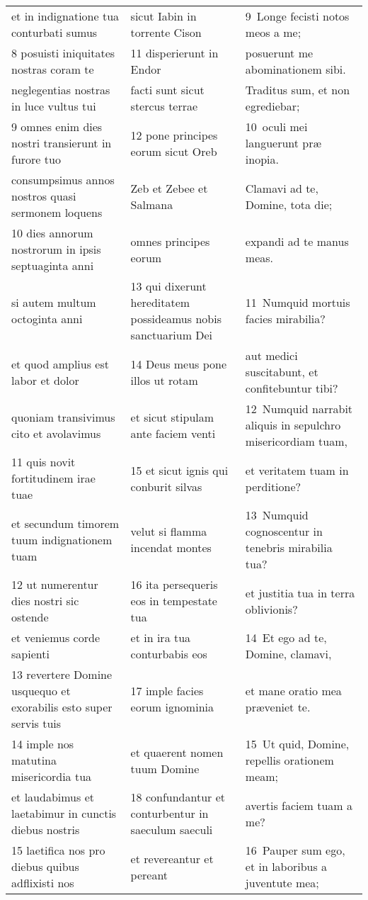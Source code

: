 \documentclass{article}
\begin{document}
\begin{longtable}{@{}p{}p{}p{}@{}}
et in indignatione tua conturbati sumus	&	sicut Iabin in torrente Cison	&	9 Longe fecisti notos meos a me;	\\
8 posuisti iniquitates nostras coram te	&	11 disperierunt in Endor	&	posuerunt me abominationem sibi.	\\
neglegentias nostras in luce vultus tui	&	facti sunt sicut stercus terrae	&	Traditus sum, et non egrediebar;	\\
9 omnes enim dies nostri transierunt in furore tuo	&	12 pone principes eorum sicut Oreb	&	10 oculi mei languerunt præ inopia.	\\
consumpsimus annos nostros quasi sermonem loquens	&	Zeb et Zebee et Salmana	&	Clamavi ad te, Domine, tota die;	\\
10 dies annorum nostrorum in ipsis septuaginta anni	&	omnes principes eorum	&	expandi ad te manus meas.	\\
si autem multum octoginta anni	&	13 qui dixerunt hereditatem possideamus nobis sanctuarium Dei	&	11 Numquid mortuis facies mirabilia?	\\
et quod amplius est labor et dolor	&	14 Deus meus pone illos ut rotam	&	aut medici suscitabunt, et confitebuntur tibi?	\\
quoniam transivimus cito et avolavimus	&	et sicut stipulam ante faciem venti	&	12 Numquid narrabit aliquis in sepulchro misericordiam tuam,	\\
11 quis novit fortitudinem irae tuae	&	15 et sicut ignis qui conburit silvas	&	et veritatem tuam in perditione?	\\
et secundum timorem tuum indignationem tuam	&	velut si flamma incendat montes	&	13 Numquid cognoscentur in tenebris mirabilia tua?	\\
12 ut numerentur dies nostri sic ostende	&	16 ita persequeris eos in tempestate tua	&	et justitia tua in terra oblivionis?	\\
et veniemus corde sapienti	&	et in ira tua conturbabis eos	&	14 Et ego ad te, Domine, clamavi,	\\
13 revertere Domine usquequo et exorabilis esto super servis tuis	&	17 imple facies eorum ignominia	&	et mane oratio mea præveniet te.	\\
14 imple nos matutina misericordia tua	&	et quaerent nomen tuum Domine	&	15 Ut quid, Domine, repellis orationem meam;	\\
et laudabimus et laetabimur in cunctis diebus nostris	&	18 confundantur et conturbentur in saeculum saeculi	&	avertis faciem tuam a me?	\\
15 laetifica nos pro diebus quibus adflixisti nos	&	et revereantur et pereant	&	16 Pauper sum ego, et in laboribus a juventute mea;	\\

\end{longtable}
\end{document}
